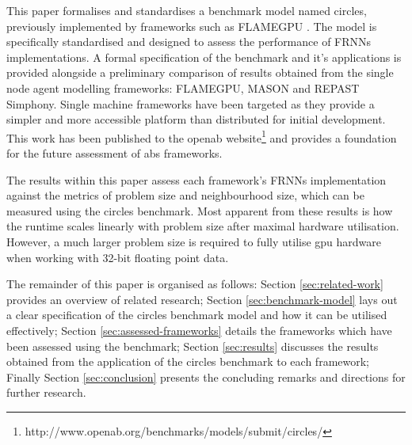   This paper formalises and standardises a benchmark model named circles, previously implemented by frameworks such as FLAMEGPU \cite{RR082}. The model is specifically standardised and designed to assess the performance of FRNNs implementations. A formal specification of the benchmark and it's applications is provided alongside a preliminary comparison of results obtained from the single node agent modelling frameworks: FLAMEGPU, MASON and REPAST Simphony. Single machine frameworks have been targeted as they provide a simpler and more accessible platform than distributed for initial development. This work has been published to the \gls{openab} website\footnote{http://www.openab.org/benchmarks/models/submit/circles/} and provides a foundation for the future assessment of \gls{abs} frameworks.
  
  The results within this paper assess each framework’s FRNNs implementation against the metrics of problem size and neighbourhood size, which can be measured using the circles benchmark. Most apparent from these results is how the runtime scales linearly with problem size after maximal hardware utilisation. However, a much larger problem size is required to fully utilise \gls{gpu} hardware when working with 32-bit floating point data.
  
  The remainder of this paper is organised as follows: Section \ref{sec:related-work} provides an overview of related research; Section \ref{sec:benchmark-model} lays out a clear specification of the circles benchmark model and how it can be utilised effectively; Section \ref{sec:assessed-frameworks} details the frameworks which have been assessed using the benchmark; Section \ref{sec:results} discusses the results obtained from the application of the circles benchmark to each framework; Finally Section \ref{sec:conclusion} presents the concluding remarks and directions for further research.